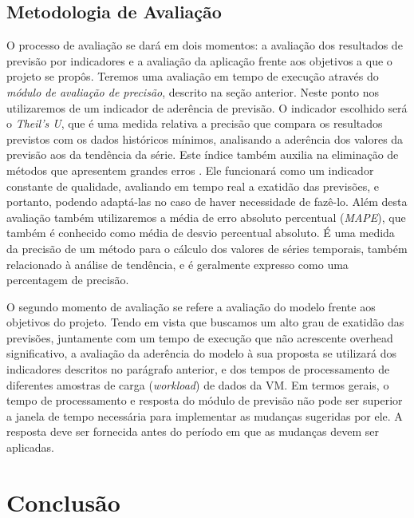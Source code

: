 \documentclass[twoside,english,brazilian]{UNISINOSmonografia}
\begin{document}
\section{Metodologia de Avaliação}
O processo de avaliação se dará em dois momentos: a avaliação dos resultados de previsão por indicadores e a avaliação da aplicação frente aos objetivos a que o projeto se propôs. Teremos uma avaliação em tempo de execução através do \textit{módulo de avaliação de precisão}, descrito na seção anterior. Neste ponto nos utilizaremos de um indicador de aderência de previsão. O indicador escolhido será o \textit{Theil's U}, que é uma medida relativa a precisão que compara os resultados previstos com os dados históricos mínimos, analisando a aderência dos valores da previsão aos da tendência da série. Este índice também auxilia na eliminação de métodos que apresentem grandes erros \cite{Shumway2000}. Ele funcionará como um indicador constante de qualidade, avaliando em tempo real a exatidão das previsões, e portanto, podendo adaptá-las no caso de haver necessidade de fazê-lo. Além desta avaliação também utilizaremos a média de erro absoluto percentual (\textit{MAPE}), que também é conhecido como média de desvio percentual absoluto. É uma medida da precisão de um método para o cálculo dos valores de séries temporais, também relacionado à análise de tendência, e é geralmente expresso como uma percentagem de precisão.

O segundo momento de avaliação se refere a avaliação do modelo frente aos objetivos do projeto. Tendo em vista que buscamos um alto grau de exatidão das previsões, juntamente com um tempo de execução que não acrescente overhead significativo, a avaliação da aderência do modelo à sua proposta se utilizará dos indicadores descritos no parágrafo anterior, e dos tempos de processamento de diferentes amostras de carga (\textit{workload}) de dados da VM. Em termos gerais, o tempo de processamento e resposta do módulo de previsão não pode ser superior a janela de tempo necessária para implementar as mudanças sugeridas por ele. A resposta deve ser fornecida antes do período em que as mudanças devem ser aplicadas.


\chapter{Conclusão}
\end{document}
